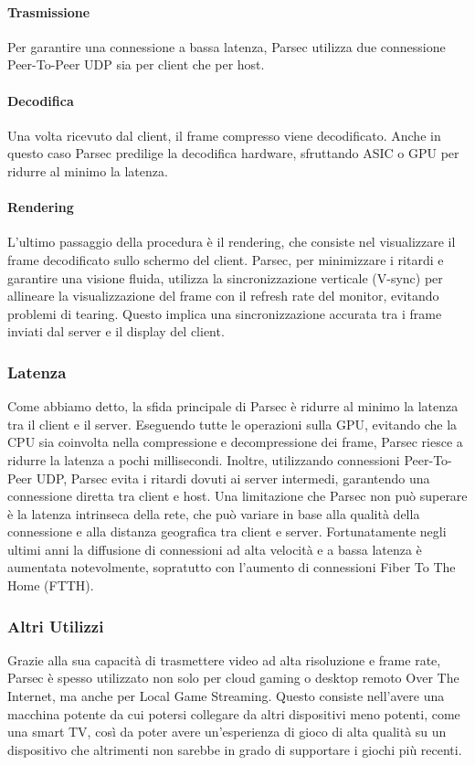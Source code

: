 \documentclass[12pt,a4paper,openright,twoside]{book}
\begin{document}
\paragraph{Trasmissione}
Per garantire una connessione a bassa latenza, Parsec utilizza due connessione Peer-To-Peer UDP sia per client che per host.

\paragraph{Decodifica}
Una volta ricevuto dal client, il frame compresso viene decodificato. Anche in questo caso Parsec predilige la decodifica hardware, sfruttando ASIC o GPU per ridurre al minimo la latenza.

\paragraph{Rendering}
L'ultimo passaggio della procedura è il rendering, che consiste nel visualizzare il frame decodificato sullo schermo del client. Parsec, per minimizzare i ritardi e garantire una visione fluida, utilizza la sincronizzazione verticale (V-sync) per allineare la visualizzazione del frame con il refresh rate del monitor, evitando problemi di tearing. Questo implica una sincronizzazione accurata tra i frame inviati dal server e il display del client.

\subsubsection{Latenza}
Come abbiamo detto, la sfida principale di Parsec è ridurre al minimo la latenza tra il client e il server. Eseguendo tutte le operazioni sulla GPU, evitando che la CPU sia coinvolta nella compressione e decompressione dei frame, Parsec riesce a ridurre la latenza a pochi millisecondi. Inoltre, utilizzando connessioni Peer-To-Peer UDP, Parsec evita i ritardi dovuti ai server intermedi, garantendo una connessione diretta tra client e host. Una limitazione che Parsec non può superare è la latenza intrinseca della rete, che può variare in base alla qualità della connessione e alla distanza geografica tra client e server. Fortunatamente negli ultimi anni la diffusione di connessioni ad alta velocità e a bassa latenza è aumentata notevolmente, sopratutto con l'aumento di connessioni Fiber To The Home (FTTH).

\subsubsection{Altri Utilizzi}
Grazie alla sua capacità di trasmettere video ad alta risoluzione e frame rate, Parsec è spesso utilizzato non solo per cloud gaming o desktop remoto Over The Internet, ma anche per Local Game Streaming. Questo consiste nell'avere una macchina potente da cui potersi collegare da altri dispositivi meno potenti, come una smart TV, così da poter avere un'esperienza di gioco di alta qualità su un dispositivo che altrimenti non sarebbe in grado di supportare i giochi più recenti.
\end{document}
